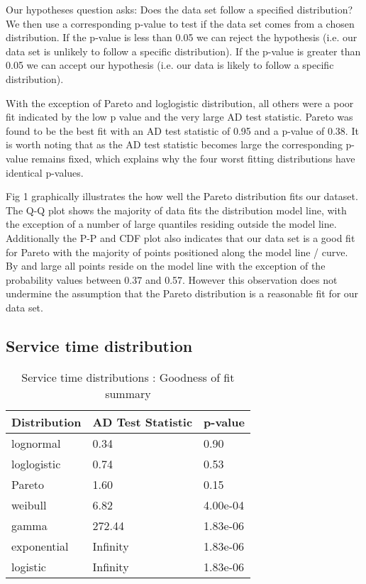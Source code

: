 \documentclass[5p]{elsarticle}
\begin{document}
Our hypotheses question asks: Does the data set follow a specified distribution? We then use a corresponding p-value to test if the data set comes from a chosen distribution. If the p-value is less than 0.05 we can reject the hypothesis (i.e. our data set is unlikely to follow a specific distribution). If the p-value is greater than 0.05 we can accept our hypothesis (i.e. our data is likely to follow a specific distribution). 


With the exception of Pareto and loglogistic distribution, all others were a poor fit indicated by the low p value and the very large AD test statistic. Pareto was found to be the best fit with an AD test statistic of 0.95 and a p-value of 0.38. It is worth noting that as the AD test statistic becomes large the corresponding p-value remains fixed, which explains why the four worst fitting distributions have identical p-values.

Fig 1 graphically illustrates the how well the Pareto distribution fits our dataset. The Q-Q plot shows the majority of data fits the distribution model line, with the exception of a number of large quantiles residing outside the model line. Additionally the P-P and CDF plot also indicates that our data set is a good fit for Pareto with the majority of points positioned along the model line / curve. By and large all points reside on the model line with the exception of the probability values between 0.37 and 0.57. However this observation does not undermine the assumption that the Pareto distribution is a reasonable fit for our data set. 

\subsection{Service time distribution}

\begin {table}
\caption {Service time distributions :  Goodness of fit summary} 
\begin{center}
\begin{tabular}{p{2.1cm} |  p{3.1cm} | p{1.3cm}} \hline \bf{Distribution} & \bf{AD Test Statistic} & \bf{p-value}
\\ \hline lognormal & 0.34 & 0.90
\\ loglogistic & 0.74 & 0.53
\\ Pareto & 1.60 & 0.15 
\\ weibull  & 6.82 & 4.00e-04 
\\ gamma & 272.44 & 1.83e-06	
\\ exponential & Infinity & 1.83e-06
\\ logistic & Infinity  & 1.83e-06	
\\ \hline
\end{tabular}
\end{center}
\end{table}
\end{document}
